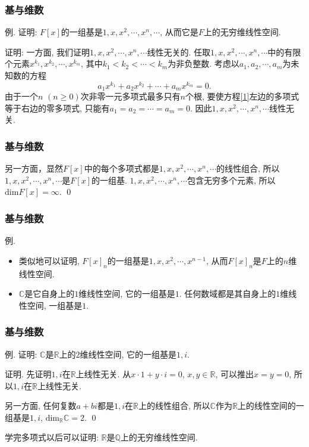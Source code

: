 \documentclass[CJK]{beamer}
\begin{document}
\begin{frame}
	\frametitle{基与维数}
	例. 证明: $F[x]$的一组基是$1, x, x^{2}, \cdots, x^{n}, \cdots$, 从而它是$F$上的无穷维线性空间.\pause
	\vspace{0.5cm}
	
	证明: 一方面, 我们证明$1, x, x^{2}, \cdots, x^{n}, \cdots$线性无关的. \pause 任取$1, x, x^{2}, \cdots, x^{n}, \cdots$中的有限个元素$x^{k_{1}}, x^{k_{2}}, \cdots, x^{k_{m}}$, 其中$k_{1}<k_{2}<\cdots <k_{m}$为非负整数. 考虑以$a_{1}, a_{2}, \cdots, a_{m}$为未知数的方程
	\begin{equation} \label{1}
		a_{1}x^{k_{1}}+a_{2}x^{k_{2}}+\cdots+a_{m}x^{k_{m}}=0.
	\end{equation}\pause
	由于一个$n$ $(n\geqslant 0)$次非零一元多项式最多只有$n$个根, 要使方程\eqref{1}左边的多项式等于右边的零多项式, 只能有$a_{1}=a_{2}= \cdots=a_{m}=0$. 因此$1, x, x^{2}, \cdots, x^{n}, \cdots$线性无关.
\end{frame}

\begin{frame}
	\frametitle{基与维数}
	另一方面，显然$F[x]$中的每个多项式都是$1, x, x^{2}, \cdots, x^{n}, \cdots$的线性组合, 所以$1, x, x^{2}, \cdots, x^{n}, \cdots$是$F[x]$的一组基. $1, x, x^{2}, \cdots, x^{n}, \cdots$包含无穷多个元素, 所以$\mathrm{dim}F[x]=\infty$. \qed
\end{frame}

\begin{frame}
	\frametitle{基与维数}
	 例. 
	 \begin{itemize}
	 	\item 类似地可以证明, $F[x]_{n}$的一组基是$1, x, x^{2}, \cdots, x^{n-1}$, 从而$F[x]_{n}$是$F$上的$n$维线性空间. \pause
	 	
	 	\item $\mathbb{C}$是它自身上的$1$维线性空间, 它的一组基是$1$. 任何数域都是其自身上的$1$维线性空间, 一组基是$1$.
	 \end{itemize}
\end{frame}

\begin{frame}
	\frametitle{基与维数}
	例. 证明: $\mathbb{C}$是$\mathbb{R}$上的$2$维线性空间, 它的一组基是$1, i$.\pause
	
	\vspace{0.5cm}
	
	证明. 先证明$1, i$在$\mathbb{R}$上线性无关. \pause 从$x\cdot 1+y\cdot i=0$, $x, y\in\mathbb{R}$, 可以推出$x=y=0$, 所以$1, i$在$\mathbb{R}$上线性无关. \pause 
	
	另一方面, 任何复数$a+bi$都是$1, i$在$\mathbb{R}$上的线性组合, 所以$\mathbb{C}$作为$\mathbb{R}$上的线性空间的一组基是$1, i$, $\mathrm{dim}_{\mathbb{R}}\mathbb{C}=2$. \qed \pause
	
	\vspace{0.5cm}
	
	学完多项式以后可以证明: $\mathbb{R}$是$\mathbb{Q}$上的无穷维线性空间.
\end{frame}
\end{document}
